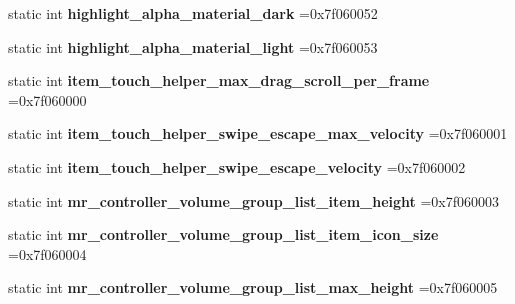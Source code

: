 \begin{DoxyCompactItemize}
static int {\bfseries highlight\+\_\+alpha\+\_\+material\+\_\+dark} =0x7f060052
\item 
\mbox{\label{classandroid_1_1support_1_1graphics_1_1drawable_1_1R_1_1dimen_adf27178569ffed5e7e9d28bcca264923}} 
static int {\bfseries highlight\+\_\+alpha\+\_\+material\+\_\+light} =0x7f060053
\item 
\mbox{\label{classandroid_1_1support_1_1graphics_1_1drawable_1_1R_1_1dimen_a72099da9a5995ae56b4df27bc27db142}} 
static int {\bfseries item\+\_\+touch\+\_\+helper\+\_\+max\+\_\+drag\+\_\+scroll\+\_\+per\+\_\+frame} =0x7f060000
\item 
\mbox{\label{classandroid_1_1support_1_1graphics_1_1drawable_1_1R_1_1dimen_a791c1e719eb5d0d971f3f0977d2606a0}} 
static int {\bfseries item\+\_\+touch\+\_\+helper\+\_\+swipe\+\_\+escape\+\_\+max\+\_\+velocity} =0x7f060001
\item 
\mbox{\label{classandroid_1_1support_1_1graphics_1_1drawable_1_1R_1_1dimen_a7a97cdc2b15917bf98c5cc515115e25f}} 
static int {\bfseries item\+\_\+touch\+\_\+helper\+\_\+swipe\+\_\+escape\+\_\+velocity} =0x7f060002
\item 
\mbox{\label{classandroid_1_1support_1_1graphics_1_1drawable_1_1R_1_1dimen_abc6d7ce15f86067ae55f914b18258a1a}} 
static int {\bfseries mr\+\_\+controller\+\_\+volume\+\_\+group\+\_\+list\+\_\+item\+\_\+height} =0x7f060003
\item 
\mbox{\label{classandroid_1_1support_1_1graphics_1_1drawable_1_1R_1_1dimen_ab16858061a75a43ac808ce794db9be93}} 
static int {\bfseries mr\+\_\+controller\+\_\+volume\+\_\+group\+\_\+list\+\_\+item\+\_\+icon\+\_\+size} =0x7f060004
\item 
\mbox{\label{classandroid_1_1support_1_1graphics_1_1drawable_1_1R_1_1dimen_a5d40c1115d5e114cf9bdfecc731c34f9}} 
static int {\bfseries mr\+\_\+controller\+\_\+volume\+\_\+group\+\_\+list\+\_\+max\+\_\+height} =0x7f060005

\end{DoxyCompactItemize}
